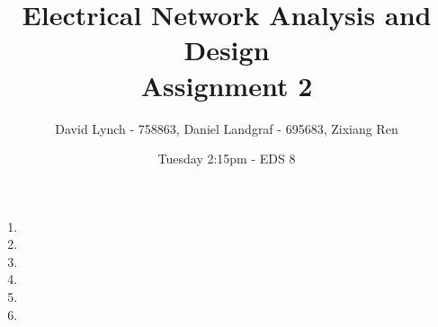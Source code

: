 \documentclass[10pt,a4paper]{article}
\author{David Lynch - 758863, Daniel Landgraf - 695683, Zixiang Ren }
\title{\huge{Electrical Network Analysis and Design} \\ Assignment 2}
\date{\small{Tuesday 2:15pm - EDS 8}}
\begin{document}
\maketitle

	\begin{enumerate}
		\item{
		\let\clearpage\relax
		
		}
		\item{
		\let\clearpage\relax
		
		}
		\item{
		\let\clearpage\relax
		
		}
		\item{
		\let\clearpage\relax
		
		}
		\item{
		\let\clearpage\relax
		
		}
		
		\item{
		\let\clearpage\relax
		
		}
	\end{enumerate}
\end{document}
